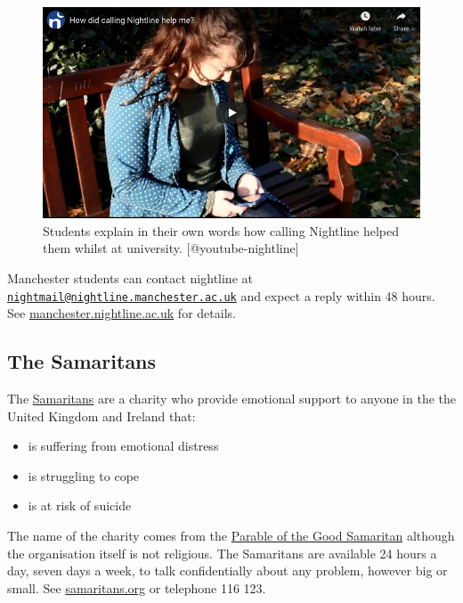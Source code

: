 \documentclass[
]{book}
\providecommand{\tightlist}{%
  \setlength{\itemsep}{0pt}\setlength{\parskip}{0pt}}
\begin{document}
\begin{figure}

{\centering \includegraphics[width=0.99\linewidth]{images/youtube-nightline} 

}

\caption{Students explain in their own words how calling Nightline helped them whilst at university. [@youtube-nightline]}\label{fig:nightline-fig}
\end{figure}

Manchester students can contact nightline at \href{mailto:nightmail@nightline.manchester.ac.uk}{\nolinkurl{nightmail@nightline.manchester.ac.uk}} and expect a reply within 48 hours. See \href{https://manchester.nightline.ac.uk/}{manchester.nightline.ac.uk} for details.

\hypertarget{samaritans}{%
\subsection{The Samaritans}\label{samaritans}}

The \href{https://en.wikipedia.org/wiki/Samaritans_(charity)}{Samaritans} are a charity who provide emotional support to anyone in the the United Kingdom and Ireland that:

\begin{itemize}
\tightlist
\item
  is suffering from emotional distress
\item
  is struggling to cope
\item
  is at risk of suicide
\end{itemize}

The name of the charity comes from the \href{https://en.wikipedia.org/wiki/Parable_of_the_Good_Samaritan}{Parable of the Good Samaritan} although the organisation itself is not religious. The Samaritans are available 24 hours a day, seven days a week, to talk confidentially about any problem, however big or small. See \href{https://www.samaritans.org/}{samaritans.org} or telephone 116 123.
\end{document}
